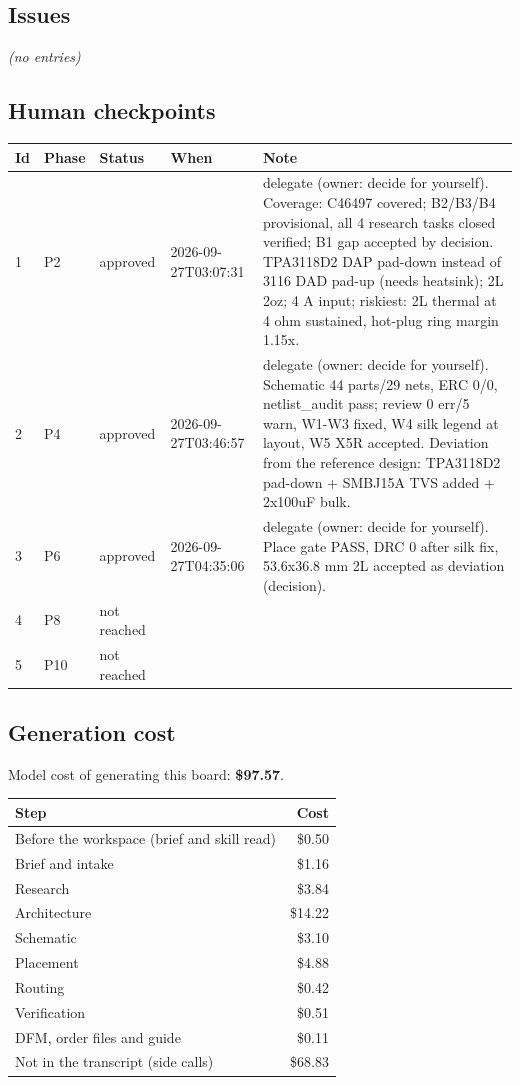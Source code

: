 \documentclass[11pt,a4paper]{article}
\begin{document}
\subsection*{Issues}
\emph{(no entries)}
\subsection*{Human checkpoints}
{\small
\begin{longtable}{lllp{2.6cm}p{6.4cm}}
\toprule
\textbf{Id} & \textbf{Phase} & \textbf{Status} & \textbf{When} & \textbf{Note} \\
\midrule
\endhead
1 & P2 & approved & 2026-09-27T03:07:31 & delegate (owner: decide for yourself). Coverage: C46497 covered; B2/B3/B4 provisional, all 4 research tasks closed verified; B1 gap accepted by decision. TPA3118D2 DAP pad-down instead of 3116 DAD pad-up (needs heatsink); 2L 2oz; 4 A input; riskiest: 2L thermal at 4 ohm sustained, hot-plug ring margin 1.15x. \\
2 & P4 & approved & 2026-09-27T03:46:57 & delegate (owner: decide for yourself). Schematic 44 parts/29 nets, ERC 0/0, netlist\_audit pass; review 0 err/5 warn, W1-W3 fixed, W4 silk legend at layout, W5 X5R accepted. Deviation from the reference design: TPA3118D2 pad-down + SMBJ15A TVS added + 2x100uF bulk. \\
3 & P6 & approved & 2026-09-27T04:35:06 & delegate (owner: decide for yourself). Place gate PASS, DRC 0 after silk fix, 53.6x36.8 mm 2L accepted as deviation (decision). \\
4 & P8 & not reached &  &  \\
5 & P10 & not reached &  &  \\
\bottomrule
\end{longtable}
}
\subsection*{Generation cost}
Model cost of generating this board: \textbf{\$97.57}.

{\small
\begin{longtable}{p{10cm}r}
\toprule
\textbf{Step} & \textbf{Cost} \\
\midrule
\endhead
Before the workspace (brief and skill read) & \$0.50 \\
Brief and intake & \$1.16 \\
Research & \$3.84 \\
Architecture & \$14.22 \\
Schematic & \$3.10 \\
Placement & \$4.88 \\
Routing & \$0.42 \\
Verification & \$0.51 \\
DFM, order files and guide & \$0.11 \\
Not in the transcript (side calls) & \$68.83 \\
\bottomrule
\end{longtable}
}
\end{document}

